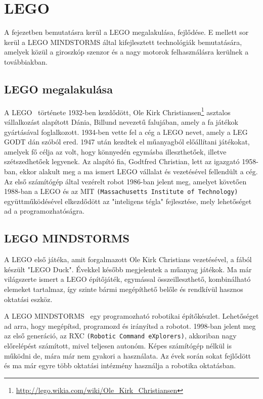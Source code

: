 \chapter{LEGO} \label{ch:ROBOT}

\begin{osszefoglal}
A fejezetben bemutatásra kerül a LEGO megalakulása, fejlődése. E mellett sor kerül a LEGO MINDSTORMS által kifejlesztett technológiák bemutatására, amelyek közül a giroszkóp szenzor és a nagy motorok felhasználásra kerülnek a továbbiakban.
\end{osszefoglal}

\section{LEGO megalakulása}\label{sec:ROBOT:lego}
A LEGO~\cite{lego}\cite{legoHistory} története 1932-ben kezdődött, Ole Kirk Christiansen\footnote{\href {http://lego.wikia.com/wiki/Ole\_Kirk\_Christiansen}{http://lego.wikia.com/wiki/Ole\_Kirk\_Christiansen}} asztalos vállalkozást alapított Dánia, Billund nevezetű falujában, amely a fa játékok gyártásával foglalkozott. 1934-ben vette fel a cég a LEGO nevet, amely a LEG GODT dán szóból ered. 1947 után kezdtek el műanyagból előállítani játékokat, amelyek fő célja az volt, hogy könnyedén egymásba illeszthetőek, illetve szétszedhetőek legyenek. Az alapító fia, Godtfred Christian, lett az igazgató 1958-ban, ekkor alakult meg a ma ismert LEGO vállalat és vezetésével fellendült a cég. Az első számítógép által vezérelt robot 1986-ban jelent meg, amelyet követően 1988-ban a LEGO és az MIT \texttt{(Massachusetts Institute of Technology)} együttműködésével elkezdődött az "inteligens tégla" fejlesztése, mely lehetőséget ad a programozhatóságra.

\section{LEGO MINDSTORMS}\label{sec:ROBOT:mindstorms}
A LEGO  első játéka, amit forgalmazott Ole Kirk Christians vezetésével, a fából készült "LEGO Duck". Évekkel később megjelentek a műanyag játékok. Ma már világszerte ismert a LEGO építőjáték, egymással összeilleszthető, kombinálható elemeket tartalmaz, így szinte bármi megépíthető belőle és rendkívül hasznos oktatási eszköz. 

A LEGO MINDSTORMS~\cite{mindstormsHistory} egy programozható robotikai építőkészlet. Lehetőséget ad arra, hogy megépítsd, programozd és irányítsd a robotot.
1998-ban jelent meg az első generáció, az RXC \texttt{(Robotic Command eXplorers)}, akkoriban nagy előrelépést számított, mivel teljesen autonóm. Képes számítógép nélkül is működni de, mára már nem gyakori a használata. Az évek során sokat fejlődött és ma már egyre több oktatási intézmény használja a robotika oktatásban.

